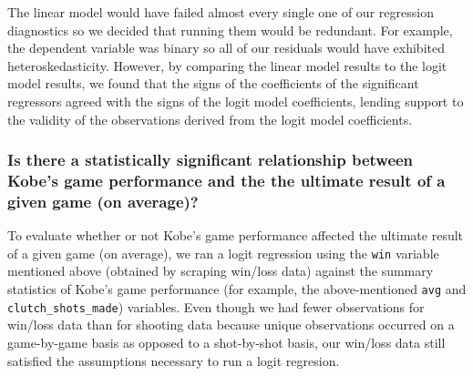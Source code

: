 \documentclass[paper=a4, fontsize=11pt]{scrartcl} %
\numberwithin{equation}{section} %
\numberwithin{figure}{section} %
\numberwithin{table}{section} %
\begin{document}
\hspace*{1cm}The linear model would have failed almost every single one of our regression diagnostics so we decided that running them would be redundant. For example, the dependent variable was binary so all of our residuals would have exhibited heteroskedasticity. However, by comparing the linear model results to the logit model results, we found that the signs of the coefficients of the significant regressors agreed with the signs of the logit model coefficients, lending support to the validity of the observations derived from the logit model coefficients. 

\subsubsection{Is there a statistically significant relationship between Kobe's game performance and the the ultimate result of a given game (on average)?}
\hspace*{1cm}To evaluate whether or not Kobe's game performance affected the ultimate result of a given game (on average), we ran a logit regression using the \texttt{win} variable mentioned above (obtained by scraping win/loss data) against the summary statistics of Kobe's game performance (for example, the above-mentioned \texttt{avg} and \texttt{clutch\_shots\_made}) variables. Even though we had fewer observations for win/loss data than for shooting data because unique observations occurred on a game-by-game basis as opposed to a shot-by-shot basis, our win/loss data still satisfied the assumptions necessary to run a logit regresion. 
\end{document}
